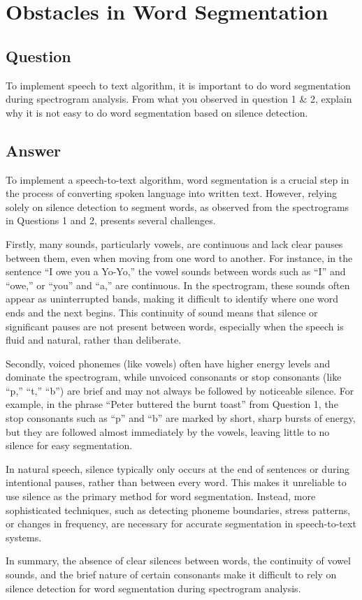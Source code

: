 
\section{Obstacles in Word Segmentation}

\subsection{Question}

To implement speech to text algorithm, it is important to do word segmentation during spectrogram analysis. From what you observed in question 1 \& 2, explain why it is not easy to do word segmentation based on silence detection.

\subsection{Answer}

To implement a speech-to-text algorithm, word segmentation is a crucial step in the process of converting spoken language into written text. However, relying solely on silence detection to segment words, as observed from the spectrograms in Questions 1 and 2, presents several challenges.

Firstly, many sounds, particularly vowels, are continuous and lack clear pauses between them, even when moving from one word to another. For instance, in the sentence ``I owe you a Yo-Yo,'' the vowel sounds between words such as ``I'' and ``owe,'' or ``you'' and ``a,'' are continuous. In the spectrogram, these sounds often appear as uninterrupted bands, making it difficult to identify where one word ends and the next begins. This continuity of sound means that silence or significant pauses are not present between words, especially when the speech is fluid and natural, rather than deliberate.

Secondly, voiced phonemes (like vowels) often have higher energy levels and dominate the spectrogram, while unvoiced consonants or stop consonants (like ``p,'' ``t,'' ``b'') are brief and may not always be followed by noticeable silence. For example, in the phrase ``Peter buttered the burnt toast'' from Question 1, the stop consonants such as ``p'' and ``b'' are marked by short, sharp bursts of energy, but they are followed almost immediately by the vowels, leaving little to no silence for easy segmentation.

In natural speech, silence typically only occurs at the end of sentences or during intentional pauses, rather than between every word. This makes it unreliable to use silence as the primary method for word segmentation. Instead, more sophisticated techniques, such as detecting phoneme boundaries, stress patterns, or changes in frequency, are necessary for accurate segmentation in speech-to-text systems.

In summary, the absence of clear silences between words, the continuity of vowel sounds, and the brief nature of certain consonants make it difficult to rely on silence detection for word segmentation during spectrogram analysis.

\newpage